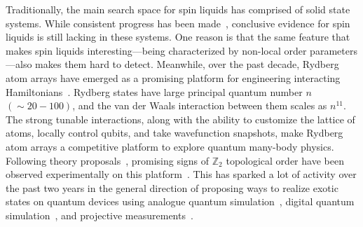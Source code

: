 \documentclass[twocolumn,superscriptaddress,amsmath,amssymb,aps,prx,nofootinbib]{revtex4-2}
\begin{document}
Traditionally, the main search space for spin liquids has comprised of solid state systems. While consistent progress has been made~\cite{savary2017,knolle2019field}, conclusive evidence for spin liquids is still lacking in these systems. One reason is that the same feature that makes spin liquids interesting---being characterized by non-local order parameters---also makes them hard to detect. Meanwhile, over the past decade, Rydberg atom arrays have emerged as a promising platform for engineering interacting Hamiltonians~\cite{weimer2010rydberg,ebadi2021quantum,wu2021concise,saffman2010,lukin2001,labuhn2016,jaksch2000,browaeys2016,barredo2016anatom,beguin2013,barredo2018,semeghini2021, bernien2017probing,bluvstein2022quantum,guardado-sanchez2018probing,keesling2019quantum,levine2019parallel,lienhard2018observing,madjarov2020highfidelity,omran2019generation,schauss2015crystallization,song2021quantum}. Rydberg states have large principal quantum number $n$ $(\sim 20-100)$, and the van der Waals interaction between them scales as $n^{11}$. The strong tunable interactions, along with the ability to customize the lattice of atoms, locally control qubits, and take wavefunction snapshots, make Rydberg atom arrays a competitive platform to explore quantum many-body physics. Following theory proposals~\cite{verresen2021,samajdar2021}, promising signs of $\mathbb{Z}_2$ topological order have been observed experimentally on this platform~\cite{semeghini2021}. This has sparked a lot of activity over the past two years in the general direction of proposing ways to realize exotic states on quantum devices using analogue quantum simulation~\cite{myerson2022construction,slagle2022quantum,kornjavca2022trimer, giudice2022trimer,zhou2022quantum}, digital quantum simulation~\cite{liu2021methods}, and projective measurements~\cite{tantivasadakarn2022shortest,verresen2021efficiently}. 
\end{document}

